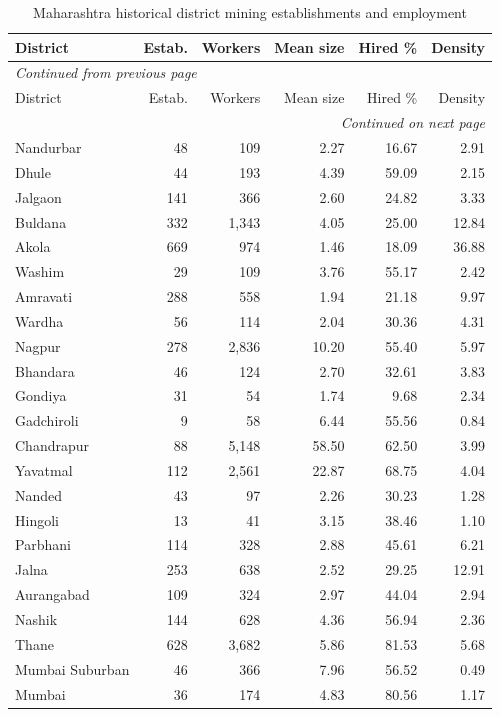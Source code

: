 \documentclass[11pt,a4paper]{report}
\begin{document}
\begin{longtable}{lrrrrr}
\caption{Maharashtra historical district mining establishments and employment}\\\toprule
District & Estab. & Workers & Mean size & Hired \% & Density \\\midrule\endfirsthead
\multicolumn{6}{l}{\textit{Continued from previous page}}\\\toprule
District & Estab. & Workers & Mean size & Hired \% & Density \\\midrule\endhead
\midrule\multicolumn{6}{r}{\textit{Continued on next page}}\\\endfoot\bottomrule\endlastfoot
Nandurbar & 48 & 109 & 2.27 & 16.67 & 2.91 \\
Dhule & 44 & 193 & 4.39 & 59.09 & 2.15 \\
Jalgaon & 141 & 366 & 2.60 & 24.82 & 3.33 \\
Buldana & 332 & 1,343 & 4.05 & 25.00 & 12.84 \\
Akola & 669 & 974 & 1.46 & 18.09 & 36.88 \\
Washim & 29 & 109 & 3.76 & 55.17 & 2.42 \\
Amravati & 288 & 558 & 1.94 & 21.18 & 9.97 \\
Wardha & 56 & 114 & 2.04 & 30.36 & 4.31 \\
Nagpur & 278 & 2,836 & 10.20 & 55.40 & 5.97 \\
Bhandara & 46 & 124 & 2.70 & 32.61 & 3.83 \\
Gondiya & 31 & 54 & 1.74 & 9.68 & 2.34 \\
Gadchiroli & 9 & 58 & 6.44 & 55.56 & 0.84 \\
Chandrapur & 88 & 5,148 & 58.50 & 62.50 & 3.99 \\
Yavatmal & 112 & 2,561 & 22.87 & 68.75 & 4.04 \\
Nanded & 43 & 97 & 2.26 & 30.23 & 1.28 \\
Hingoli & 13 & 41 & 3.15 & 38.46 & 1.10 \\
Parbhani & 114 & 328 & 2.88 & 45.61 & 6.21 \\
Jalna & 253 & 638 & 2.52 & 29.25 & 12.91 \\
Aurangabad & 109 & 324 & 2.97 & 44.04 & 2.94 \\
Nashik & 144 & 628 & 4.36 & 56.94 & 2.36 \\
Thane & 628 & 3,682 & 5.86 & 81.53 & 5.68 \\
Mumbai Suburban & 46 & 366 & 7.96 & 56.52 & 0.49 \\
Mumbai & 36 & 174 & 4.83 & 80.56 & 1.17 \\

\end{longtable}
\end{document}
